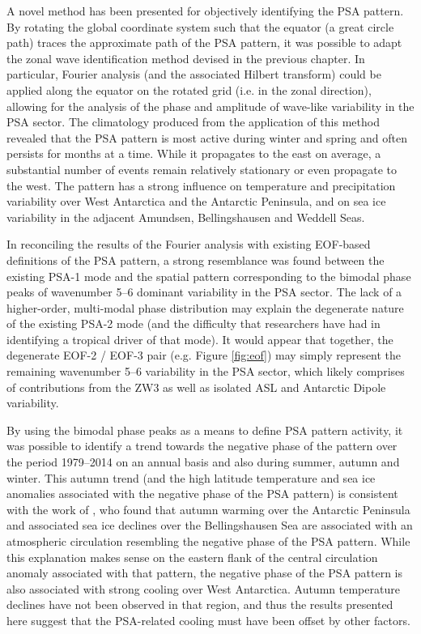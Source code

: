 A novel method has been presented for objectively identifying the PSA pattern. By rotating the global coordinate system such that the equator (a great circle path) traces the approximate path of the PSA pattern, it was possible to adapt the zonal wave identification method devised in the previous chapter. In particular, Fourier analysis (and the associated Hilbert transform) could be applied along the equator on the rotated grid (i.e. in the zonal direction), allowing for the analysis of the phase and amplitude of wave-like variability in the PSA sector. The climatology produced from the application of this method revealed that the PSA pattern is most active during winter and spring and often persists for months at a time. While it propagates to the east on average, a substantial number of events remain relatively stationary or even propagate to the west. The pattern has a strong influence on temperature and precipitation variability over West Antarctica and the Antarctic Peninsula, and on sea ice variability in the adjacent Amundsen, Bellingshausen and Weddell Seas. 

In reconciling the results of the Fourier analysis with existing EOF-based definitions of the PSA pattern, a strong resemblance was found between the existing PSA-1 mode and the spatial pattern corresponding to the bimodal phase peaks of wavenumber 5--6 dominant variability in the PSA sector. The lack of a higher-order, multi-modal phase distribution may explain the degenerate nature of the existing PSA-2 mode (and the difficulty that researchers have had in identifying a tropical driver of that mode). It would appear that together, the degenerate EOF-2 / EOF-3 pair (e.g. Figure \ref{fig:eof}) may simply represent the remaining wavenumber 5--6 variability in the PSA sector, which likely comprises of contributions from the ZW3 as well as isolated ASL and Antarctic Dipole variability.    

By using the bimodal phase peaks as a means to define PSA pattern activity, it was possible to identify a trend towards the negative phase of the pattern over the period 1979--2014 on an annual basis and also during summer, autumn and winter. This autumn trend (and the high latitude temperature and sea ice anomalies associated with the negative phase of the PSA pattern) is consistent with the work of \citet{Ding2013}, who found that autumn warming over the Antarctic Peninsula and associated sea ice declines over the Bellingshausen Sea are associated with an atmospheric circulation resembling the negative phase of the PSA pattern. While this explanation makes sense on the eastern flank of the central circulation anomaly associated with that pattern, the negative phase of the PSA pattern is also associated with strong cooling over West Antarctica. Autumn temperature declines have not been observed in that region, and thus the results presented here suggest that the PSA-related cooling must have been offset by other factors. 

